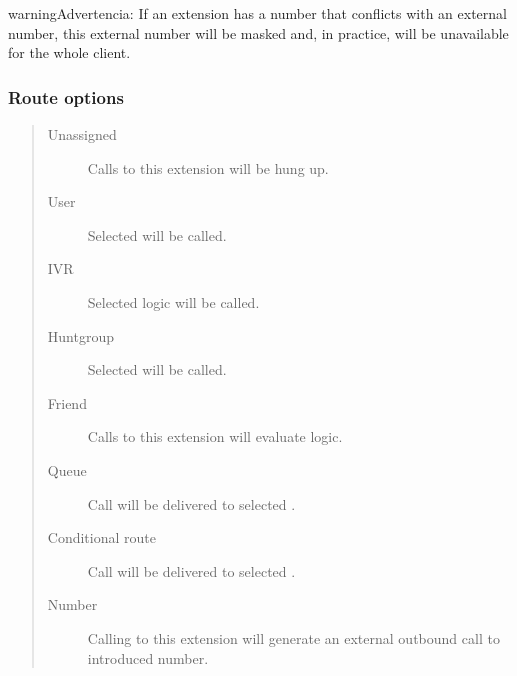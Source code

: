 \documentclass[letterpaper,10pt,spanish]{sphinxmanual}
\begin{document}
\begin{notice}{warning}{Advertencia:}
If an extension has a number that conflicts with an external
number, this external number will be masked and, in practice, will be
unavailable for the whole client.
\end{notice}


\subsubsection{Route options}
\label{administration_portal/client/vpbx/extensions:route-options}\begin{quote}
\begin{description}
\item[{Unassigned}] \leavevmode
Calls to this extension will be hung up.

\item[{User}] \leavevmode
Selected {\hyperref[administration_portal/client/vpbx/users:users]{}} will be called.

\item[{IVR}] \leavevmode
Selected {\hyperref[administration_portal/client/vpbx/routing_endpoints/ivrs:ivrs]{}} logic will be called.

\item[{Huntgroup}] \leavevmode
Selected {\hyperref[administration_portal/client/vpbx/routing_endpoints/hunt_groups:huntgroups]{}} will be called.

\item[{Friend}] \leavevmode
Calls to this extension will evaluate {\hyperref[administration_portal/client/vpbx/routing_endpoints/friends/index:friends]{}} logic.

\item[{Queue}] \leavevmode
Call will be delivered to selected {\hyperref[administration_portal/client/vpbx/routing_endpoints/queues:queues]{}}.

\item[{Conditional route}] \leavevmode
Call will be delivered to selected {\hyperref[administration_portal/client/vpbx/routing_endpoints/conditional_routes:id1]{}}.

\item[{Number}] \leavevmode
Calling to this extension will generate an external outbound call
to introduced number.

\end{description}
\end{quote}
\end{document}
